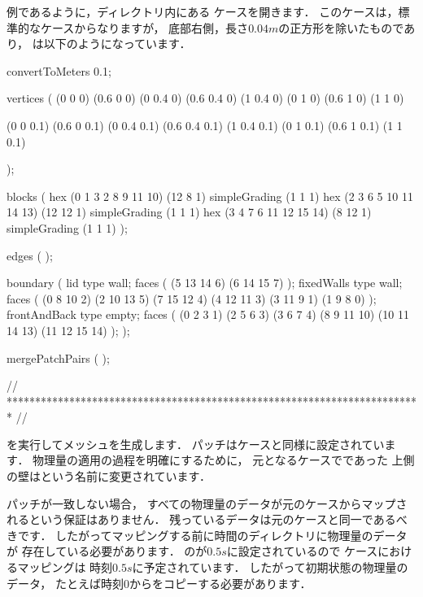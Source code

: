 例であるように，ディレクトリ内にある
ケースを開きます．
このケースは，標準的なケースからなりますが，
底部右側，長さ$0.04\unit{m}$の正方形を除いたものであり，
は以下のようになっています．
\begin{OFverbatim}[file, linenum=17]
convertToMeters 0.1;

vertices
(
    (0 0 0)
    (0.6 0 0)
    (0 0.4 0)
    (0.6 0.4 0)
    (1 0.4 0)
    (0 1 0)
    (0.6 1 0)
    (1 1 0)

    (0 0 0.1)
    (0.6 0 0.1)
    (0 0.4 0.1)
    (0.6 0.4 0.1)
    (1 0.4 0.1)
    (0 1 0.1)
    (0.6 1 0.1)
    (1 1 0.1)

);

blocks
(
    hex (0 1 3 2 8 9 11 10) (12 8 1) simpleGrading (1 1 1)
    hex (2 3 6 5 10 11 14 13) (12 12 1) simpleGrading (1 1 1)
    hex (3 4 7 6 11 12 15 14) (8 12 1) simpleGrading (1 1 1)
);

edges
(
);

boundary
(
    lid
    {
        type wall;
        faces
        (
            (5 13 14 6)
            (6 14 15 7)
        );
    }
    fixedWalls
    {
        type wall;
        faces
        (
            (0 8 10 2)
            (2 10 13 5)
            (7 15 12 4)
            (4 12 11 3)
            (3 11 9 1)
            (1 9 8 0)
        );
    }
    frontAndBack
    {
        type empty;
        faces
        (
            (0 2 3 1)
            (2 5 6 3)
            (3 6 7 4)
            (8 9 11 10)
            (10 11 14 13)
            (11 12 15 14)
        );
    }
);

mergePatchPairs
(
);

// ************************************************************************* //
\end{OFverbatim}
を実行してメッシュを生成します．
パッチはケースと同様に設定されています．
物理量の適用の過程を明確にするために，
元となるケースでであった
上側の壁はという名前に変更されています．

パッチが一致しない場合，
すべての物理量のデータが元のケースからマップされるという保証はありません．
残っているデータは元のケースと同一であるべきです．
したがってマッピングする前に時間のディレクトリに物理量のデータが
存在している必要があります．
のが$0.5\unit{s}$に設定されているので
ケースにおけるマッピングは
時刻$0.5\unit{s}$に予定されています．
したがって初期状態の物理量のデータ，
たとえば時刻0からをコピーする必要があります．

